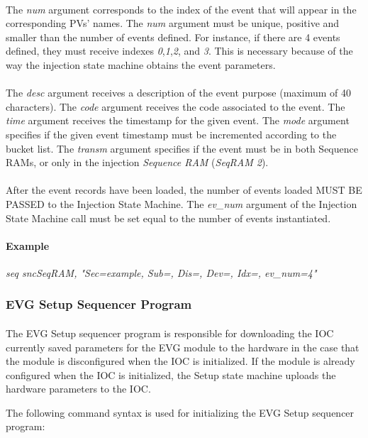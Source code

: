 \documentclass[openany]{article}
\begin{document}
			\paragraph{} The \emph{num} argument corresponds to the index of the event that will appear in the corresponding PVs' names. The \emph{num} argument must be unique, positive and smaller than the number of events defined. For instance, if there are 4 events defined, they must receive indexes \emph{0},\emph{1},\emph{2}, and \emph{3}. This is necessary because of the way the injection state machine obtains the event parameters.
			\paragraph{} The \emph{desc} argument receives a description of the event purpose (maximum of 40 characters). The \emph{code} argument receives the code associated to the event. The \emph{time} argument receives the timestamp for the given event. The \emph{mode} argument specifies if the given event timestamp must be incremented according to the bucket list. The \emph{transm} argument specifies if the event must be in both Sequence RAMs, or only in the injection \emph{Sequence RAM} (\emph{SeqRAM 2}).
			\paragraph{} After the event records have been loaded, the number of events loaded MUST BE PASSED to the Injection State Machine. The \emph{ev\_num} argument of the Injection State Machine call must be set equal to the number of events instantiated.
			\paragraph{Example} \emph{seq sncSeqRAM, "Sec=example, Sub=, Dis=, Dev=, Idx=, ev\_num=4"}

		\subsubsection{EVG Setup Sequencer Program}

			\paragraph{} The EVG Setup sequencer program is responsible for downloading the IOC currently saved parameters for the EVG module to the hardware in the case that the module is disconfigured when the IOC is initialized. If the module is already configured when the IOC is initialized, the Setup state machine uploads the hardware parameters to the IOC.
			\par The following command syntax is used for initializing the EVG Setup sequencer program:
\end{document}
